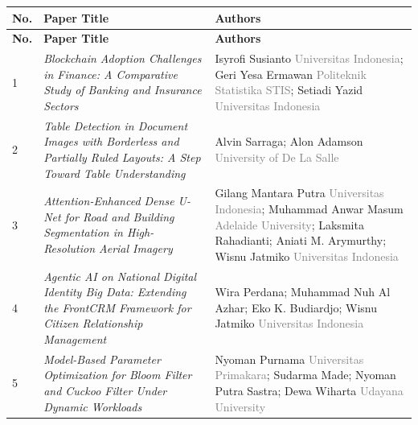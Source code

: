 \documentclass[10pt,a4paper]{article}
\begin{document}
\begin{longtable}{
    |>{\centering\arraybackslash}p{0.7cm}
    |>{\raggedright\arraybackslash}p{8.2cm}
    |>{\raggedright\arraybackslash}p{5.0cm}|
}
\hline
\rowcolor{conf}
\color{white}\textbf{No.} &
\color{white}\textbf{Paper Title} &
\color{white}\textbf{Authors} \\
\hline
\endfirsthead

\hline
\rowcolor{conf}
\color{white}\textbf{No.} &
\color{white}\textbf{Paper Title} &
\color{white}\textbf{Authors} \\
\hline
\endhead

1 &
\textit{Blockchain Adoption Challenges in Finance: A Comparative Study of Banking and Insurance Sectors} &
Isyrofi Susianto \newline
\textcolor{gray}{Universitas Indonesia}; Geri Yesa Ermawan \newline
\textcolor{gray}{Politeknik Statistika STIS}; Setiadi Yazid \newline
\textcolor{gray}{Universitas Indonesia} \\
\hline

2 &
\textit{Table Detection in Document Images with Borderless and Partially Ruled Layouts: A Step Toward Table Understanding} &
Alvin Sarraga; Alon Adamson \newline
\textcolor{gray}{University of De La Salle} \\
\hline

3 &
\textit{Attention-Enhanced Dense U-Net for Road and Building Segmentation in High-Resolution Aerial Imagery} &
Gilang Mantara Putra \newline
\textcolor{gray}{Universitas Indonesia}; Muhammad Anwar Masum \newline
\textcolor{gray}{Adelaide University}; Laksmita Rahadianti; Aniati M. Arymurthy; Wisnu Jatmiko \newline
\textcolor{gray}{Universitas Indonesia} \\
\hline

4 &
\textit{Agentic AI on National Digital Identity Big Data: Extending the FrontCRM Framework for Citizen Relationship Management} &
Wira Perdana; Muhammad Nuh Al Azhar; Eko K. Budiardjo; Wisnu Jatmiko \newline
\textcolor{gray}{Universitas Indonesia} \\
\hline

5 &
\textit{Model-Based Parameter Optimization for Bloom Filter and Cuckoo Filter Under Dynamic Workloads} &
Nyoman Purnama \newline
\textcolor{gray}{Universitas Primakara}; Sudarma Made; Nyoman Putra Sastra; Dewa Wiharta \newline
\textcolor{gray}{Udayana University} \\
\hline
\end{longtable}
\normalsize
\end{document}
